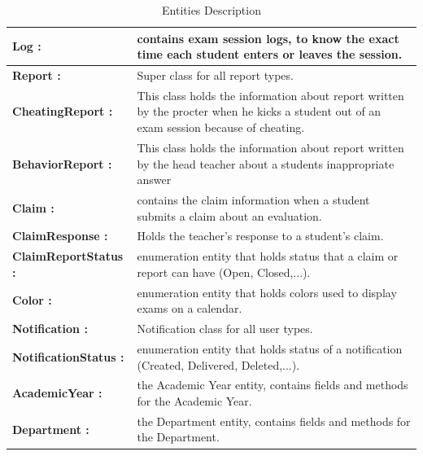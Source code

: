 \documentclass[]{uc2pfecaneva}
\begin{document}
    \clearpage

    \begin{table}[t]
        \begin{tabularx}{\textwidth}{|l|X|}
            \hline
            \textbf{Log :} & contains exam session logs, to know the exact time each student enters or leaves the session.\\ \hline
            \textbf{Report :} & Super class for all report types.\\ \hline
            \textbf{CheatingReport :} & This class holds the information about report written by the procter when he kicks a student out of an exam session because of cheating.\\ \hline
            \textbf{BehaviorReport :} & This class holds the information about report written by the head teacher about a students inappropriate answer\\ \hline
            \textbf{Claim :} & contains the claim information when a student submits a claim about an evaluation.\\ \hline
            \textbf{ClaimResponse :} & Holds the teacher's response to a student's claim.\\ \hline
            \textbf{ClaimReportStatus :} & enumeration entity that holds status that a claim or report can have (Open, Closed,...).\\ \hline
            \textbf{Color :} & enumeration entity that holds colors used to display exams on a calendar.\\ \hline
            \textbf{Notification :} & Notification class for all user types.\\ \hline
            \textbf{NotificationStatus :} &  enumeration entity that holds status of a notification (Created, Delivered, Deleted,...).\\ \hline
            \textbf{AcademicYear :} & the Academic Year entity, contains fields and methods for the Academic Year.\\ \hline
            \textbf{Department :} & the Department entity, contains fields and methods for the Department.\\ \hline
        \end{tabularx}
        \caption{Entities Description}
        \label{table:1}
    \end{table}
\end{document}
